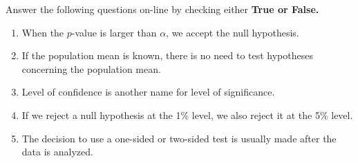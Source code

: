 \item Answer the following questions on-line by checking either \textbf{True or False.}
\begin{enumerate}
\item When the $p$-value is larger than $\alpha$, we accept the null hypothesis. 
\item If the population mean is known, there is no need to test hypotheses concerning the population mean.
\item Level of confidence is another name for level of significance. 
\item If we reject a null hypothesis at the 1\% level, we also reject it at the 5\% level. 
\item The decision to use a one-sided or two-sided test is usually made after the data is analyzed. 
\end{enumerate}
